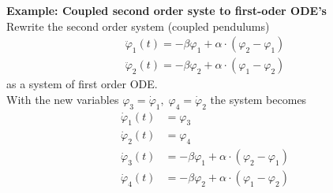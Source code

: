 \textbf{Example: Coupled second order syste to first-oder ODE's}\\
Rewrite the second order system (coupled pendulums)
\begin{equation}
  \begin{split}
    \ddot{\varphi}_1(t) = -\beta \varphi_1 + \alpha \cdot (\varphi_2 - \varphi_1)\\
    \ddot{\varphi}_2(t) = -\beta \varphi_2 + \alpha \cdot (\varphi_1 - \varphi_2)
  \end{split}
\end{equation}
as a system of first order ODE.\\
With the new variables $\varphi_3 = \dot{\varphi}_1,\; \varphi_4 = \dot{\varphi}_2$ the system becomes
\begin{equation}
  \begin{split}
    \dot{\varphi}_1(t) &= \varphi_3\\
    \dot{\varphi}_2(t) &= \varphi_4\\
    \dot{\varphi}_3(t) &= -\beta \varphi_1 + \alpha \cdot (\varphi_2 - \varphi_1)\\
    \dot{\varphi}_4(t) &= -\beta \varphi_2 + \alpha \cdot (\varphi_1 - \varphi_2)
  \end{split}
\end{equation}
